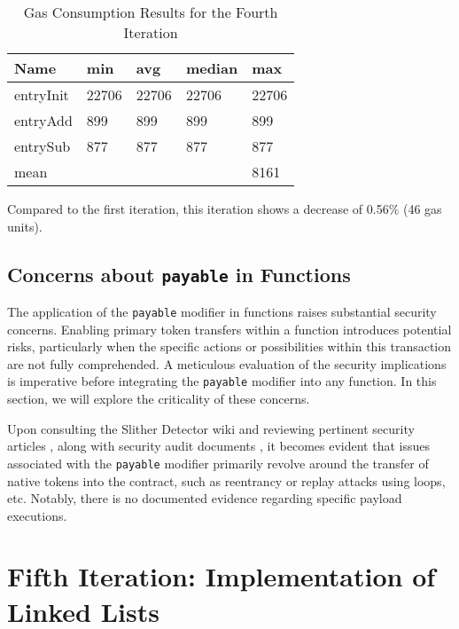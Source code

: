 \documentclass[fleqn,10pt]{olplainarticle}
\begin{document}
\begin{table}[H]
	\centering
	\begin{tabular}{|l|l|l|l|l|}
		\hline
		Name       & min    & avg   & median &  max   \\ \hline
		entryInit  & 22706  & 22706 & 22706  &  22706 \\ \hline
		entryAdd   & 899  	& 899 	& 899    &  899   \\ \hline
		entrySub   & 877  	& 877 	& 877    &  877   \\ \hline
		mean       &\cellcolor{black}&\cellcolor{black}&\cellcolor{black}&8161\\ \hline
	\end{tabular}
	\caption{Gas Consumption Results for the Fourth Iteration}
	\label{tab:FourthIT}
\end{table}


Compared to the first iteration, this iteration shows a decrease of 0.56\% (46 gas units).

\subsection{Concerns about \texttt{payable} in Functions}

The application of the \texttt{payable} modifier in functions raises substantial security concerns. Enabling primary token transfers within a function introduces potential risks, particularly when the specific actions or possibilities within this transaction are not fully comprehended. A meticulous evaluation of the security implications is imperative before integrating the \texttt{payable} modifier into any function. In this section, we will explore the criticality of these concerns.

Upon consulting the Slither Detector wiki \cite{trail_of_bits_detector_nodate} and reviewing pertinent security articles \cite{noauthor_smart_2023,noauthor_recommendations_nodate}, along with security audit documents \cite{watchpug_h04_nodate,berndartmueller_m01_nodate,chin_use_nodate}, it becomes evident that issues associated with the \texttt{payable} modifier primarily revolve around the transfer of native tokens into the contract, such as reentrancy or replay attacks using loops, etc. Notably, there is no documented evidence regarding specific payload executions.



\section{Fifth Iteration: Implementation of Linked Lists}
\end{document}
